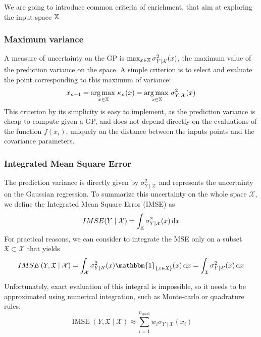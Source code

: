 \documentclass[../../Main_ManuscritThese.tex]{subfiles}
\newcommand{\IMSE}{\mathop{IMSE}}
\begin{document}
We are going to introduce common criteria of enrichment, that aim at exploring the input space $\mathbb{X}$

\subsubsection{Maximum variance}
A measure of uncertainty on the GP is $\max_{x\in\mathbb{X}} \sigma_{Y \mid \mathcal{X}}^2(x)$, the maximum value of the prediction variance on the space.
A simple criterion is to select and evaluate the point corresponding to this maximum of variance:
\begin{equation}
  x_{n+1} = \operatorname*{arg\,max \,}_{x\in \mathbb{X}} \kappa_n(x) = \operatorname*{arg\,max \,}_{x \in \mathbb{X}} \sigma^2_{Y \mid \mathcal{X}}(x)
\end{equation}
This criterion by its simplicity is easy to implement, as the prediction variance is cheap to compute given a GP, and does not depend directly on the evaluations of the function $f(x_i)$, uniquely on the distance between the inputs points and the covariance parameters.

\subsubsection{Integrated Mean Square Error}
\cite{sacks_designs_1989}
The prediction variance is directly given by $\sigma^2_{Y\mid \mathcal{X}}$ and represents the uncertainty on the Gaussian regression. To summarize this uncertainty on the whole space $\mathcal{X}$, we define the Integrated Mean Square Error (IMSE) as
\begin{equation}
  \IMSE(Y \mid \mathcal{X}) = \int_{\Xspace} \sigma_{Y\mid\mathcal{X}}^2(x)\,\mathrm{d}x
\end{equation}
For practical reasons, we can consider to integrate the MSE only on a subset $\mathfrak{X}\subset \mathcal{X}$ that yields
\begin{equation}
  \IMSE\left(Y,\mathfrak{X} \mid \mathcal{X} \right) = \int_{\mathcal{X}} \sigma^2_{Y\mid \mathcal{X}}(x)  \mathbbm{1}_{\{x \in \mathfrak{X}\}}(x)\,\mathrm{d}x = \int_{\mathfrak{X}} \sigma^2_{Y\mid \mathcal{X}}(x)\,\mathrm{d}x
\end{equation}

Unfortunately, exact evaluation of this integral is impossible, so it needs to be approximated using numerical integration, such as Monte-carlo or quadrature rules:
\begin{equation}
  \IMSE(Y,\mathfrak{X} \mid \mathcal{X}) \approx \sum_{i=1}^{n_{\mathrm{quad}}} w_i \sigma_{Y\mid\mathcal{X}}(x_i)
\end{equation}
\end{document}
